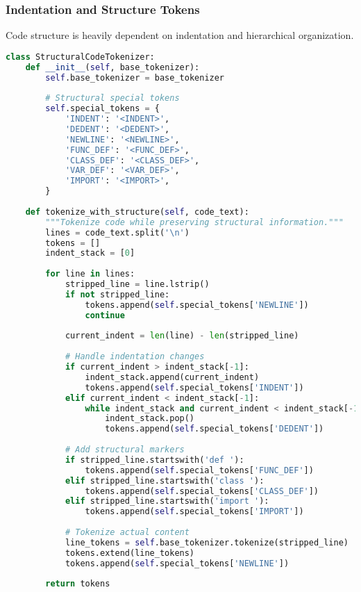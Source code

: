 \subsubsection{Indentation and Structure Tokens}

Code structure is heavily dependent on indentation and hierarchical organization.

\begin{lstlisting}[language=Python, caption=Structure-aware code tokenization]
class StructuralCodeTokenizer:
    def __init__(self, base_tokenizer):
        self.base_tokenizer = base_tokenizer
        
        # Structural special tokens
        self.special_tokens = {
            'INDENT': '<INDENT>',
            'DEDENT': '<DEDENT>',
            'NEWLINE': '<NEWLINE>',
            'FUNC_DEF': '<FUNC_DEF>',
            'CLASS_DEF': '<CLASS_DEF>',
            'VAR_DEF': '<VAR_DEF>',
            'IMPORT': '<IMPORT>',
        }
        
    def tokenize_with_structure(self, code_text):
        """Tokenize code while preserving structural information."""
        lines = code_text.split('\n')
        tokens = []
        indent_stack = [0]
        
        for line in lines:
            stripped_line = line.lstrip()
            if not stripped_line:
                tokens.append(self.special_tokens['NEWLINE'])
                continue
            
            current_indent = len(line) - len(stripped_line)
            
            # Handle indentation changes
            if current_indent > indent_stack[-1]:
                indent_stack.append(current_indent)
                tokens.append(self.special_tokens['INDENT'])
            elif current_indent < indent_stack[-1]:
                while indent_stack and current_indent < indent_stack[-1]:
                    indent_stack.pop()
                    tokens.append(self.special_tokens['DEDENT'])
            
            # Add structural markers
            if stripped_line.startswith('def '):
                tokens.append(self.special_tokens['FUNC_DEF'])
            elif stripped_line.startswith('class '):
                tokens.append(self.special_tokens['CLASS_DEF'])
            elif stripped_line.startswith('import '):
                tokens.append(self.special_tokens['IMPORT'])
            
            # Tokenize actual content
            line_tokens = self.base_tokenizer.tokenize(stripped_line)
            tokens.extend(line_tokens)
            tokens.append(self.special_tokens['NEWLINE'])
        
        return tokens
\end{lstlisting}

